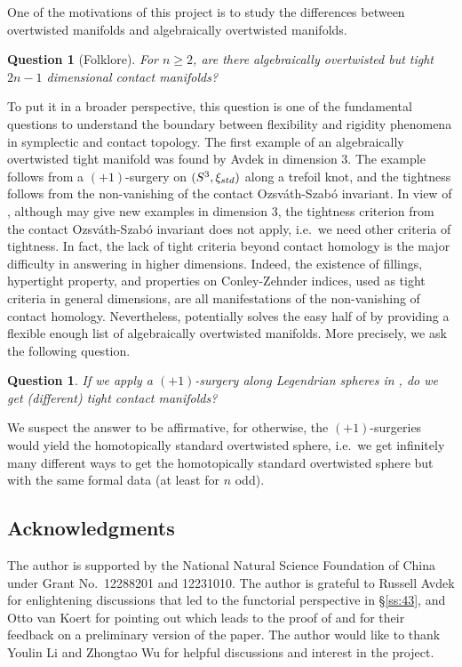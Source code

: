 \documentclass[reqno,11pt]{amsart}
\numberwithin{equation}{section}
\newtheorem{question}[theorem]{Question}
\def\std{\rm std}
\begin{document}
One of the motivations of this project is to study the differences between overtwisted manifolds and algebraically overtwisted manifolds.
\begin{question}[Folklore]\label{question:AO}
For $n\ge 2$, are there algebraically overtwisted but tight $2n-1$ dimensional contact manifolds?
\end{question}
To put it in a broader perspective, this question is one of the fundamental questions to understand the boundary between flexibility and rigidity phenomena in symplectic and contact topology. The first example of an algebraically overtwisted tight manifold was found by Avdek \cite{avdek2020combinatorial} in dimension $3$. The example follows from a $(+1)$-surgery on $(S^3,\xi_{\std})$ along a trefoil knot, and the tightness follows from the non-vanishing of the contact Ozsv\'ath-Szab\'o invariant. In view of \cite[Theorem 1.1]{DLW}, although  may give new examples in dimension $3$, the tightness criterion from the contact Ozsv\'ath-Szab\'o invariant does not apply, i.e.\ we need other criteria of tightness. In fact, the lack of tight criteria beyond contact homology is the major difficulty in answering  in higher dimensions. Indeed, the existence of fillings, hypertight property, and properties on Conley-Zehnder indices, used as tight criteria in general dimensions, are all manifestations of the non-vanishing of contact homology. Nevertheless,  potentially solves the easy half of  by providing a flexible enough list of algebraically overtwisted manifolds. More precisely, we ask the following question.

\begin{question}
    If we apply a $(+1)$-surgery along Legendrian spheres in , do we get (different) tight contact manifolds?
\end{question}
We suspect the answer to be affirmative, for otherwise, the $(+1)$-surgeries would yield the homotopically standard overtwisted sphere, i.e.\ we get infinitely many different ways to get the homotopically standard overtwisted sphere but with the same formal data (at least for $n$ odd).
\subsection*{Acknowledgments}
The author is supported by the National Natural Science Foundation of China under Grant No.\ 12288201 and 12231010. The author is grateful to Russell Avdek for enlightening discussions that led to the functorial perspective in \S \ref{ss:43}, and Otto van Koert for pointing out \cite{zbMATH06562001} which leads to the proof of  and for their feedback on a preliminary version of the paper. The author would like to thank Youlin Li and Zhongtao Wu for helpful discussions and interest in the project.
\end{document}
